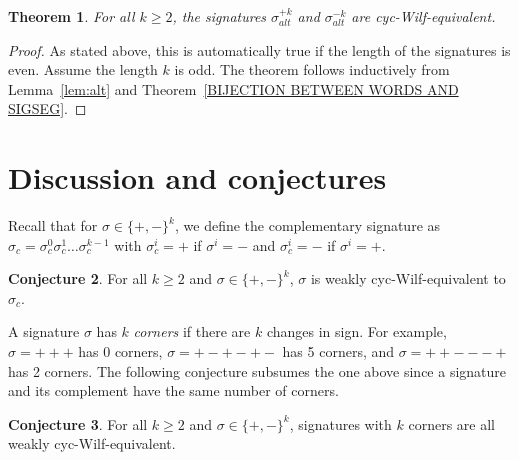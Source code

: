 \documentclass[12pt]{article}
\theoremstyle{plain}
\newtheorem{theorem}{Theorem}
\theoremstyle{definition}
\newtheorem{conjecture}[theorem]{Conjecture}
\begin{document}

\begin{theorem}
For all $k\geq 2$, the signatures $\sigma_{alt}^{+k}$ and $\sigma_{alt}^{-k}$ are cyc-Wilf-equivalent.
\end{theorem}
\begin{proof}
As stated above, this is automatically true if the length of the signatures is even. Assume the length $k$ is odd. The theorem follows inductively from Lemma~\ref{lem:alt} and Theorem~\ref{BIJECTION BETWEEN WORDS AND SIGSEG}.
\end{proof}


\section{Discussion and conjectures} \label{SECTION CONJECTURES}

Recall that for $\sigma \in \{+,-\}^k$, we define the complementary signature as $\sigma_c = \sigma^0_c\sigma^1_c\ldots \sigma^{k-1}_c$ with $\sigma^i_c = +$ if $\sigma^i=-$ and $\sigma^i_c = -$ if $\sigma^i=+$.
\begin{conjecture} For all $k\geq 2$ and $\sigma \in\{+,-\}^k$, 
$\sigma$ is weakly cyc-Wilf-equivalent to $\sigma_c$.
\end{conjecture}

A signature $\sigma$ has $k$ \textit{corners} if there are $k$ changes in sign. For example, $\sigma =+++$ has 0 corners, $\sigma = +-+-+-$ has 5 corners, and $\sigma = ++---+$ has 2 corners. The following conjecture subsumes the one above since a signature and its complement have the same number of corners.
\begin{conjecture} 
For all $k\geq 2$ and $\sigma \in\{+,-\}^k$, signatures with $k$ corners are all weakly cyc-Wilf-equivalent. 
\end{conjecture}

%
%
%
\end{document}

